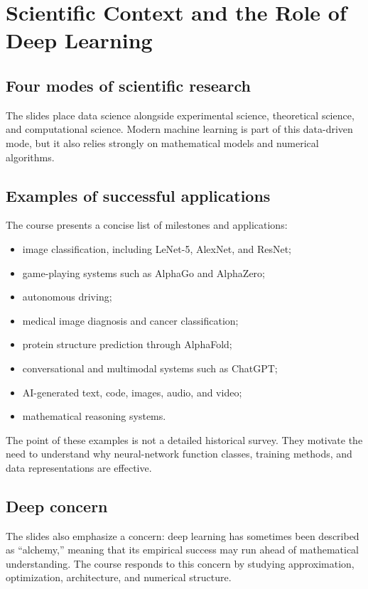 \documentclass[11pt,a4paper]{article}
\theoremstyle{definition}
\theoremstyle{plain}
\theoremstyle{remark}
\begin{document}
\section{Scientific Context and the Role of Deep Learning}

\subsection{Four modes of scientific research}
The slides place data science alongside experimental science, theoretical science, and computational science. Modern machine learning is part of this data-driven mode, but it also relies strongly on mathematical models and numerical algorithms.

\subsection{Examples of successful applications}
The course presents a concise list of milestones and applications:
\begin{itemize}
  \item image classification, including LeNet-5, AlexNet, and ResNet;
  \item game-playing systems such as AlphaGo and AlphaZero;
  \item autonomous driving;
  \item medical image diagnosis and cancer classification;
  \item protein structure prediction through AlphaFold;
  \item conversational and multimodal systems such as ChatGPT;
  \item AI-generated text, code, images, audio, and video;
  \item mathematical reasoning systems.
\end{itemize}
The point of these examples is not a detailed historical survey. They motivate the need to understand why neural-network function classes, training methods, and data representations are effective.

\subsection{Deep concern}
The slides also emphasize a concern: deep learning has sometimes been described as ``alchemy,'' meaning that its empirical success may run ahead of mathematical understanding. The course responds to this concern by studying approximation, optimization, architecture, and numerical structure.
\end{document}
